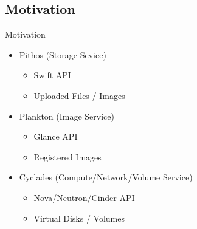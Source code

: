 \documentclass[utf8]{beamer}
\begin{document}
\subsection{Motivation}

\begin{frame}{Motivation}
  \begin{itemize}
  \item Pithos (Storage Sevice)
    \begin{itemize}
      \item Swift API
      \item Uploaded Files / Images
    \end{itemize}
  \item Plankton (Image Service)
    \begin{itemize}
      \item Glance API
      \item Registered Images
    \end{itemize}
  \item Cyclades (Compute/Network/Volume Service)
    \begin{itemize}
      \item Nova/Neutron/Cinder API
      \item Virtual Disks / Volumes
    \end{itemize}
  \end{itemize}
\end{frame}
\end{document}
